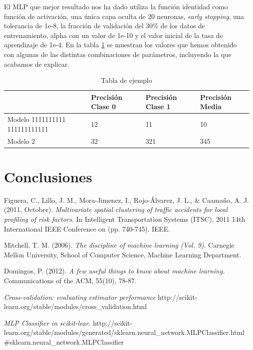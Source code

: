 \documentclass[journal,twoside]{JoPhA}
\begin{document}
El MLP que mejor resultado nos ha dado utiliza la función identidad como función de activación, una única capa oculta de 20 neuronas, \textit{early stopping}, una tolerancia de 1e-8, la fracción de validación del 30\% de los datos de entrenamiento, alpha con un valor de 1e-10 y el valor inicial de la tasa de aprendizaje de 1e-4. En la tabla \ref{tabla:tabla_mlp} se muestran los valores que hemos obtenido con algunas de las distintas combinaciones de parámetros, incluyendo la que acabamos de explicar. \\

\begin{table}[htb!]
\begin{center}
	\begin{tabular}{| p{2cm} | p{2cm} | p{2cm} | p{2cm} |}
		\hline
		 & Precisión Clase 0 & Precisión Clase 1 & Precisión Media \\
		 \hline
		 Modelo 1111111111 111111111111 & 12 & 11 & 10 \\
		 \hline
		 Modelo 2 & 32 & 321 & 345 \\
		 \hline
	\end{tabular}
	\caption{Tabla de ejemplo}
	\label{tabla:tabla_mlp}
\end{center}
\end{table}

\section{Conclusiones}

\begin{thebibliography}{1}

Figuera, C., Lillo, J. M., Mora-Jimenez, I., Rojo-Álvarez, J. L., \& Caamaño, A. J. (2011, October). \emph{Multivariate spatial clustering of traffic accidents for local profiling of risk factors.} In Intelligent Transportation Systems (ITSC), 2011 14th International IEEE Conference on (pp. 740-745). IEEE.

Mitchell, T. M. (2006). \emph{The discipline of machine learning (Vol. 9).} Carnegie Mellon University, School of Computer Science, Machine Learning Department.

Domingos, P. (2012). \emph{A few useful things to know about machine learning.} Communications of the ACM, 55(10), 78-87.

\emph{Cross-validation: evaluating estimator performance} http://scikit-learn.org/stable/modules/cross\_validation.html

\emph{MLP Classifier in scikit-lear.}
http://scikit-learn.org/stable/modules/generated/sklearn.neural\_network.MLPClassifier.html\#sklearn.neural\_network.MLPClassifier

\end{thebibliography}
\end{document}
